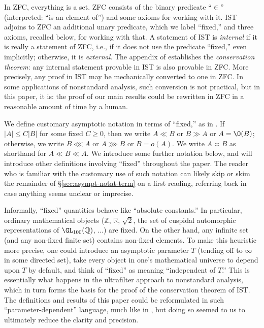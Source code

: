 In ZFC, everything is a set.  ZFC consists of the binary predicate ``$\in$'' (interpreted: ``is an element of'') and some axioms for working with it.  IST adjoins to ZFC an additional unary predicate, which we label ``fixed,'' and three axioms, recalled below, for working with that.  A statement of IST is \emph{internal} if it is really a statement of ZFC, i.e., if it does not use the predicate ``fixed,'' even implicitly; otherwise, it is \emph{external}.  The appendix of \cite{MR469763} establishes the \emph{conservation theorem}: any internal statement provable in IST is also provable in ZFC.  More precisely, any proof in IST may be mechanically converted to one in ZFC.  In some applications of nonstandard analysis, such conversion is not practical, but in this paper, it is: the proof of our main results could be rewritten in ZFC in a reasonable amount of time by a human.


We define customary asymptotic notation in terms of ``fixed,'' as in \cite[\S3.1]{2020arXiv201202187N}.   If $|A| \leq C |B|$ for some fixed $C \geq 0$, then we write $A \ll B$ or $B \gg A$ or $A = \O(B)$; otherwise, we write $B \lll A$ or $A \ggg B$ or $B = o(A)$.  We write $A \asymp B$ as shorthand for $A \ll B \ll A$.  We introduce some further notation below, and will introduce other definitions involving ``fixed'' throughout the paper.  The reader who is familiar with the customary use of such notation can likely skip or skim the remainder of \S\ref{sec:asympt-notat-term} on a first reading, referring back in case anything seems unclear or imprecise.

Informally, ``fixed'' quantities behave like ``absolute constants.''  In particular, ordinary mathematical objects ($\mathbb{Z}$, $\mathbb{R}$, $\sqrt{2}$, the set of cuspidal automorphic representations of $\GL_{100}(\mathbb{Q})$, $\dotsc$) are fixed.  On the other hand, any infinite set (and any non-fixed finite set) contains non-fixed elements.  To make this heuristic more precise, one could introduce an asymptotic parameter $T$ (tending off to $\infty$ in some directed set), take every object in one's mathematical universe to depend upon $T$ by default, and think of ``fixed'' as meaning ``independent of $T$.''  This is essentially what happens in the ultrafilter approach to nonstandard analysis, which in turn forms the basis for the proof of the conservation theorem of IST.  The definitions and results of this paper could be reformulated in such ``parameter-dependent'' language, much like in \cite{nelson-venkatesh-1}, but doing so seemed to us to ultimately reduce the clarity and precision.

